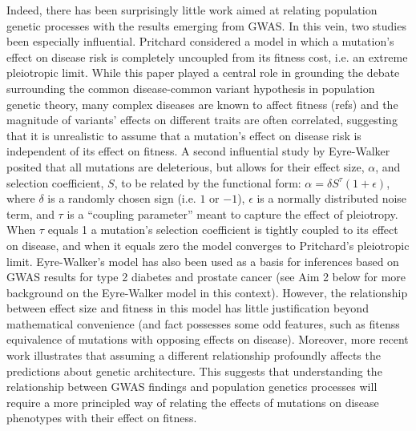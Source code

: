 \documentclass[11pt]{article}
\newcommand{\jb}[1]{{\color{blue} (#1)} }
\begin{document}
Indeed, there has been surprisingly little work aimed at relating population genetic processes with the results emerging from GWAS. In this vein, two studies been especially influential. Pritchard\cite{Pritchard:2001hw} considered a model in which a mutation’s effect on disease risk is completely uncoupled from its fitness cost, i.e. an extreme pleiotropic limit. While this paper played a central role in grounding the debate surrounding the common disease-common variant hypothesis in population genetic theory\cite{Pritchard:2002ux}, many complex diseases are known to affect fitness \jb{refs} and the magnitude of variants’ effects on different traits are often correlated\cite{BulikSullivan:2015jf,Pickrell:2016ko,Visscher:2016fp}, suggesting that it is unrealistic to assume that a mutation’s effect on disease risk is independent of its effect on fitness. A second influential study by Eyre-Walker\cite{EyreWalker:2010dn} posited that all mutations are deleterious, but allows for their effect size, $\alpha$, and selection coefficient, $S$, to be related by the functional form: $\alpha = \delta S^{\tau} (1+\epsilon)$, where $\delta$ is a randomly chosen sign (i.e. $1$ or $-1$), $\epsilon$ is a normally distributed noise term, and $\tau$ is a “coupling parameter” meant to capture the effect of pleiotropy. When $\tau$ equals 1 a mutation's selection coefficient is tightly coupled to its effect on disease, and when it equals zero the model converges to Pritchard’s pleiotropic limit.\cite{Pritchard:2001hw} Eyre-Walker’s model has also been used as a basis for inferences based on GWAS results for type 2 diabetes\cite{Agarwala:2013bu,Fuchsberger:2016df} and prostate cancer\cite{Mancuso:2015cp} (see Aim 2 below for more background on the Eyre-Walker model in this context). However, the relationship between effect size and fitness in this model has little justification beyond mathematical convenience (and fact possesses some odd features, such as fitenss equivalence of mutations with opposing effects on disease). Moreover, more recent work illustrates that assuming a different relationship profoundly affects the predictions about genetic architecture\cite{Caballero:2015ce}. This suggests that understanding the relationship between GWAS findings and population genetics processes will require a more principled way of relating the effects of mutations on disease phenotypes with their effect on fitness.
\end{document}
